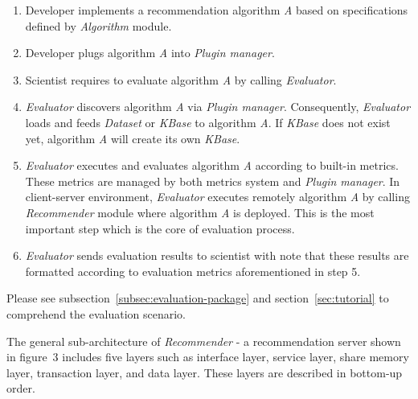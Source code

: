 \documentclass[a4paper]{llncs}
\begin{document}
\begin{enumerate}
\item Developer implements a recommendation algorithm \textit{A} based on specifications defined by \textit{Algorithm} module.
\item Developer plugs algorithm \textit{A} into \textit{Plugin manager}.
\item Scientist requires to evaluate algorithm \textit{A} by calling \textit{Evaluator}.
\item \textit{Evaluator} discovers algorithm \textit{A} via \textit{Plugin manager}. Consequently, \textit{Evaluator} loads and feeds \textit{Dataset} or \textit{KBase} to algorithm \textit{A}. If \textit{KBase} does not exist yet, algorithm \textit{A} will create its own \textit{KBase}.
\item \textit{Evaluator} executes and evaluates algorithm \textit{A} according to built-in metrics. These metrics are managed by both metrics system and \textit{Plugin manager}. In client-server environment, \textit{Evaluator} executes remotely algorithm \textit{A} by calling \textit{Recommender} module where algorithm \textit{A} is deployed. This is the most important step which is the core of evaluation process.
\item \textit{Evaluator} sends evaluation results to scientist with note that these results are formatted according to evaluation metrics aforementioned in step 5.
\end{enumerate}
Please see subsection~\ref{subsec:evaluation-package} and section~\ref{sec:tutorial} to comprehend the evaluation scenario.

The general sub-architecture of \textit{Recommender} - a recommendation server shown in figure~3 includes five layers such as interface layer, service layer, share memory layer, transaction layer, and data layer. These layers are described in bottom-up order.
\end{document}

